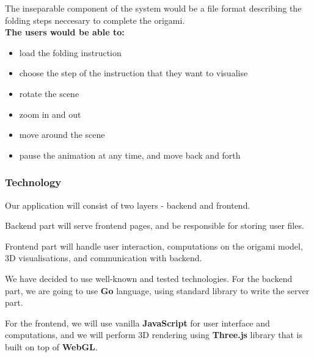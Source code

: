 The inseparable component of the system would be a file format describing the folding steps neccesary to complete the origami.\\

\noindent \textbf{The users would be able to:}
\begin{itemize}
	\item load the folding instruction
	\item choose the step of the instruction that they want to visualise
	\item rotate the scene
    \item zoom in and out
	\item move around the scene
	\item pause the animation at any time, and move back and forth
\end{itemize}

\subsubsection{Technology}

Our application will consist of two layers - backend and frontend.

Backend part will serve frontend pages, and be responsible
for storing user files.

Frontend part will handle user interaction, computations on the origami model,
3D visualisations, and communication with backend.

We have decided to use well-known and tested technologies.
For the backend part, we are going to use \textbf{Go} language,
using standard library to write the server part.

For the frontend, we will use vanilla \textbf{JavaScript}
for user interface and computations,
and we will perform 3D rendering using \textbf{Three.js} library
that is built on top of \textbf{WebGL}.

